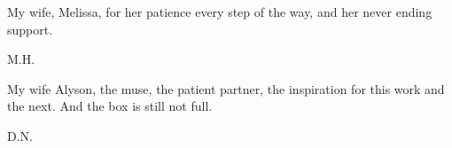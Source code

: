 \begin{minipage}[t]{0.8\textwidth}
	\raggedright
  	My wife, Melissa, for her patience every step of the way, and her never ending support. \par
  	\raggedleft
  	M.H.
\end{minipage} \vspace{1cm}



\begin{minipage}[t]{0.8\textwidth}
	\raggedright
  	My wife Alyson, the muse, the patient partner, the inspiration for this work and the next. And the box is still not full. \par
  	\raggedleft
  	D.N.
\end{minipage} 


















